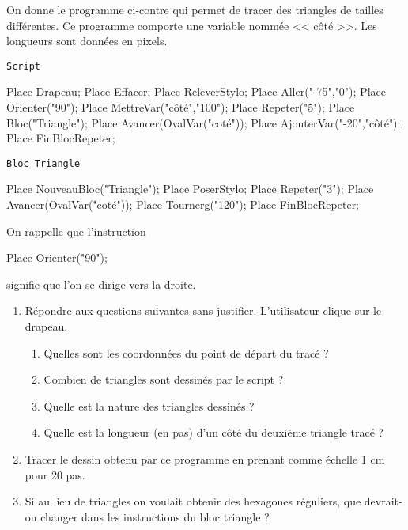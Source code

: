 On donne le programme ci-contre qui permet de tracer des triangles de tailles différentes. Ce programme comporte une variable nommée << côté >>. Les longueurs sont données en pixels. \par \medskip
   \hskip22mm
   \begin{minipage}{6.5cm}
      \hskip12mm \texttt{Script} \par \medskip
      \begin{Scratch}[Echelle=0.9]
         Place Drapeau;
         Place Effacer;
         Place ReleverStylo;
         Place Aller("-75","0");
         Place Orienter("90");
         Place MettreVar("côté","100");
         Place Repeter("5");
            Place Bloc("Triangle");
            Place Avancer(OvalVar("coté"));
            Place AjouterVar("-20","côté");
         Place FinBlocRepeter;
      \end{Scratch}
   \end{minipage}
   \qquad
   \begin{minipage}{6cm}
      \hskip8mm \texttt{Bloc Triangle} \par \medskip
      \begin{Scratch}[Echelle=0.9]
         Place NouveauBloc("Triangle");
         Place PoserStylo;
         Place Repeter("3");
            Place Avancer(OvalVar("coté"));
            Place Tournerg("120");
         Place FinBlocRepeter;
      \end{Scratch} \par \vskip6mm
      On rappelle que l’instruction \par \medskip
      \begin{Scratch}[Echelle=0.9]
         Place Orienter("90");
      \end{Scratch} \par
      signifie que l’on se dirige vers la droite.
   \end{minipage}
   \begin{enumerate}
      \setlength{\itemsep}{-1mm}
      \item Répondre aux questions suivantes sans justifier. L’utilisateur clique sur le drapeau.
         \begin{enumerate}
            \setlength{\itemsep}{-1mm}
            \item Quelles sont les coordonnées du point de départ du tracé ?
            \item Combien de triangles sont dessinés par le script ?
            \item Quelle est la nature des triangles dessinés ?
            \item Quelle est la longueur (en pas) d’un côté du deuxième triangle tracé ?
         \end{enumerate}
      \item Tracer le dessin obtenu par ce programme en prenant comme échelle 1 cm pour 20 pas.
      \item Si au lieu de triangles on voulait obtenir des hexagones réguliers, que devrait-on changer
dans les instructions du bloc triangle ?
      \end{enumerate}